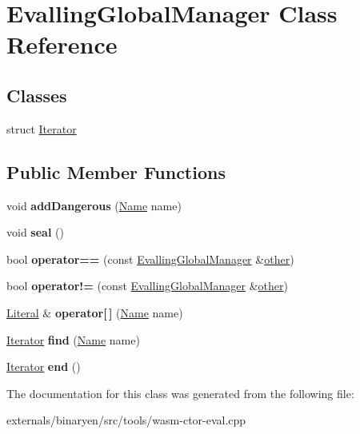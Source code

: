 \hypertarget{class_evalling_global_manager}{}\section{Evalling\+Global\+Manager Class Reference}
\label{class_evalling_global_manager}
\subsection*{Classes}
\begin{DoxyCompactItemize}
\item 
struct \mbox{\hyperlink{struct_evalling_global_manager_1_1_iterator}{Iterator}}
\end{DoxyCompactItemize}
\subsection*{Public Member Functions}
\begin{DoxyCompactItemize}
\item 
\mbox{\label{class_evalling_global_manager_ad7675b632745b96a904842a2036b4bc2}} 
void {\bfseries add\+Dangerous} (\mbox{\hyperlink{structwasm_1_1_name}{Name}} name)
\item 
\mbox{\label{class_evalling_global_manager_a31318801767d2e36adec063198569193}} 
void {\bfseries seal} ()
\item 
\mbox{\label{class_evalling_global_manager_a9dd17d7cd3f7f5380ca3e87555d70a1a}} 
bool {\bfseries operator==} (const \mbox{\hyperlink{class_evalling_global_manager}{Evalling\+Global\+Manager}} \&\mbox{\hyperlink{structother}{other}})
\item 
\mbox{\label{class_evalling_global_manager_a49c1ac9d26f7dcfd3985d49c9eceb3fc}} 
bool {\bfseries operator!=} (const \mbox{\hyperlink{class_evalling_global_manager}{Evalling\+Global\+Manager}} \&\mbox{\hyperlink{structother}{other}})
\item 
\mbox{\label{class_evalling_global_manager_a77e6a214210fef2f3717abadf4e78076}} 
\mbox{\hyperlink{classwasm_1_1_literal}{Literal}} \& {\bfseries operator\mbox{[}$\,$\mbox{]}} (\mbox{\hyperlink{structwasm_1_1_name}{Name}} name)
\item 
\mbox{\label{class_evalling_global_manager_ae0a24cecc4541ffc562ee4da97b7413a}} 
\mbox{\hyperlink{struct_evalling_global_manager_1_1_iterator}{Iterator}} {\bfseries find} (\mbox{\hyperlink{structwasm_1_1_name}{Name}} name)
\item 
\mbox{\label{class_evalling_global_manager_ae57c68142bd4ed55563f065ebfc0d645}} 
\mbox{\hyperlink{struct_evalling_global_manager_1_1_iterator}{Iterator}} {\bfseries end} ()
\end{DoxyCompactItemize}


The documentation for this class was generated from the following file\+:\begin{DoxyCompactItemize}
\item 
externals/binaryen/src/tools/wasm-\/ctor-\/eval.\+cpp\end{DoxyCompactItemize}
